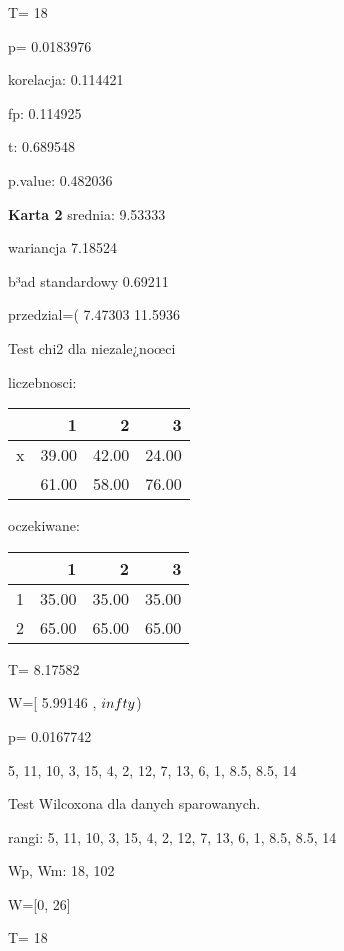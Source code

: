 \documentclass[a4paper,12pt]{article}
\begin{document}
\begin{multicols}{3}
  T=  18 
  
  p= 0.0183976 \vspace{1cm} 

  korelacja: 0.114421
     
     fp: 0.114925
     
     t: 0.689548
     
     p.value: 0.482036 \vspace{1cm} 

  \textbf{Karta  2 } 
 srednia: 9.53333 
     
     wariancja 7.18524  
     
     b³ad standardowy 0.69211 
     
     przedzial=( 7.47303 11.5936 \vspace{1cm} 

  Test chi2 dla niezale¿noœci 
   
   liczebnosci: %
\begin{tabular}{rrrr}
  \hline
 & 1 & 2 & 3 \\
  \hline
x & 39.00 & 42.00 & 24.00 \\
   & 61.00 & 58.00 & 76.00 \\
   \hline
\end{tabular}
 
   
   oczekiwane: %
\begin{tabular}{rrrr}
  \hline
 & 1 & 2 & 3 \\
  \hline
1 & 35.00 & 35.00 & 35.00 \\
  2 & 65.00 & 65.00 & 65.00 \\
   \hline
\end{tabular}
 
   
   T= 8.17582 
   
   W=[ 5.99146 , $\\infty$) 
   
   p= 0.0167742 \vspace{1cm} 

  5, 11, 10, 3, 15, 4, 2, 12, 7, 13, 6, 1, 8.5, 8.5, 14 

  Test Wilcoxona dla danych sparowanych. 
  
  rangi: 5, 11, 10, 3, 15, 4, 2, 12, 7, 13, 6, 1, 8.5, 8.5, 14 
  
  Wp, Wm:  18,  102 
  
  W=[0, 26]  
  
  T=  18 
  

\end{multicols}
\end{document}
